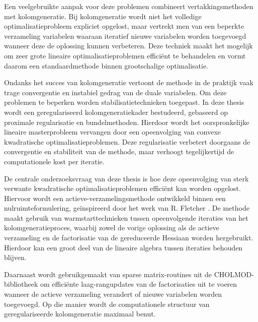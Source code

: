 \documentclass{book}
\theoremstyle{definition}
\numberwithin{algorithm_}{chapter}
\begin{document}
\bigskip

Een veelgebruikte aanpak voor deze problemen combineert vertakkingsmethoden met kolomgeneratie. Bij kolomgeneratie wordt niet het volledige optimalisatieprobleem expliciet opgelost, maar vertrekt men van een beperkte verzameling variabelen waaraan iteratief nieuwe variabelen worden toegevoegd wanneer deze de oplossing kunnen verbeteren. Deze techniek maakt het mogelijk om zeer grote lineaire optimalisatieproblemen efficiënt te behandelen en vormt daarom een standaardmethode binnen grootschalige optimalisatie.

\bigskip

Ondanks het succes van kolomgeneratie vertoont de methode in de praktijk vaak trage convergentie en instabiel gedrag van de duale variabelen. Om deze problemen te beperken worden stabilisatietechnieken toegepast. In deze thesis wordt een geregulariseerd kolomgeneratiekader bestudeerd, gebaseerd op proximale regularisatie en bundelmethoden. Hierdoor wordt het oorspronkelijke lineaire masterprobleem vervangen door een opeenvolging van convexe kwadratische optimalisatieproblemen. Deze regularisatie verbetert doorgaans de convergentie en stabiliteit van de methode, maar verhoogt tegelijkertijd de computationele kost per iteratie.

\bigskip

De centrale onderzoeksvraag van deze thesis is hoe deze opeenvolging van sterk verwante kwadratische optimalisatieproblemen efficiënt kan worden opgelost. Hiervoor wordt een actieve-verzamelingsmethode ontwikkeld binnen een nulruimteformulering, geïnspireerd door het werk van R. Fletcher \cite{fletcher2000stablehessian}. De methode maakt gebruik van warmstarttechnieken tussen opeenvolgende iteraties van het kolomgeneratieproces, waarbij zowel de vorige oplossing als de actieve verzameling en de factorisatie van de gereduceerde Hessiaan worden hergebruikt. Hierdoor kan een groot deel van de lineaire algebra tussen iteraties behouden blijven.

\bigskip

Daarnaast wordt gebruikgemaakt van sparse matrix-routines uit de CHOLMOD-bibliotheek om efficiënte laag-rangupdates van de factorisaties uit te voeren wanneer de actieve verzameling verandert of nieuwe variabelen worden toegevoegd. Op die manier wordt de computationele structuur van geregulariseerde kolomgeneratie maximaal benut.

\bigskip
\end{document}
